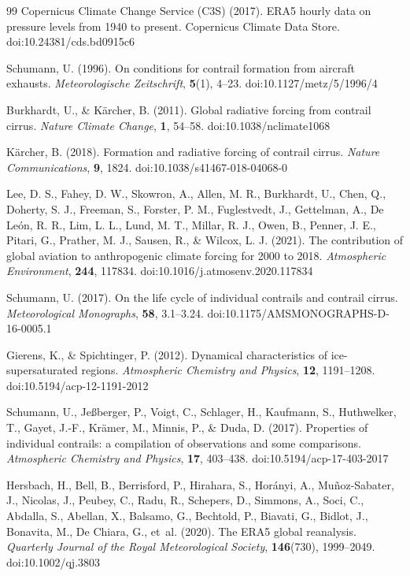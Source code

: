 \documentclass[11pt]{article}
\begin{document}
\begin{thebibliography}{99}
Copernicus Climate Change Service (C3S) (2017).
ERA5 hourly data on pressure levels from 1940 to present.
Copernicus Climate Data Store.
doi:10.24381/cds.bd0915c6

Schumann, U. (1996).
On conditions for contrail formation from aircraft exhausts.
\emph{Meteorologische Zeitschrift}, \textbf{5}(1), 4--23.
doi:10.1127/metz/5/1996/4

Burkhardt, U., \& K{\"a}rcher, B. (2011).
Global radiative forcing from contrail cirrus.
\emph{Nature Climate Change}, \textbf{1}, 54--58.
doi:10.1038/nclimate1068

K{\"a}rcher, B. (2018).
Formation and radiative forcing of contrail cirrus.
\emph{Nature Communications}, \textbf{9}, 1824.
doi:10.1038/s41467-018-04068-0

Lee, D. S., Fahey, D. W., Skowron, A., Allen, M. R., Burkhardt, U., Chen, Q.,
Doherty, S. J., Freeman, S., Forster, P. M., Fuglestvedt, J., Gettelman, A.,
De Le{\'o}n, R. R., Lim, L. L., Lund, M. T., Millar, R. J., Owen, B., Penner, J. E.,
Pitari, G., Prather, M. J., Sausen, R., \& Wilcox, L. J. (2021).
The contribution of global aviation to anthropogenic climate forcing for 2000 to 2018.
\emph{Atmospheric Environment}, \textbf{244}, 117834.
doi:10.1016/j.atmosenv.2020.117834

Schumann, U. (2017).
On the life cycle of individual contrails and contrail cirrus.
\emph{Meteorological Monographs}, \textbf{58}, 3.1--3.24.
doi:10.1175/AMSMONOGRAPHS-D-16-0005.1

Gierens, K., \& Spichtinger, P. (2012).
Dynamical characteristics of ice-supersaturated regions.
\emph{Atmospheric Chemistry and Physics}, \textbf{12}, 1191--1208.
doi:10.5194/acp-12-1191-2012

Schumann, U., Jeßberger, P., Voigt, C., Schlager, H., Kaufmann, S.,
Huthwelker, T., Gayet, J.-F., Krämer, M., Minnis, P., \& Duda, D. (2017).
Properties of individual contrails: a compilation of observations and some comparisons.
\emph{Atmospheric Chemistry and Physics}, \textbf{17}, 403--438.
doi:10.5194/acp-17-403-2017

Hersbach, H., Bell, B., Berrisford, P., Hirahara, S., Hor{\'a}nyi, A.,
Mu{\~n}oz-Sabater, J., Nicolas, J., Peubey, C., Radu, R., Schepers, D.,
Simmons, A., Soci, C., Abdalla, S., Abellan, X., Balsamo, G., Bechtold, P.,
Biavati, G., Bidlot, J., Bonavita, M., De Chiara, G., et~al. (2020).
The ERA5 global reanalysis.
\emph{Quarterly Journal of the Royal Meteorological Society}, \textbf{146}(730), 1999--2049.
doi:10.1002/qj.3803


\end{thebibliography}
\end{document}
